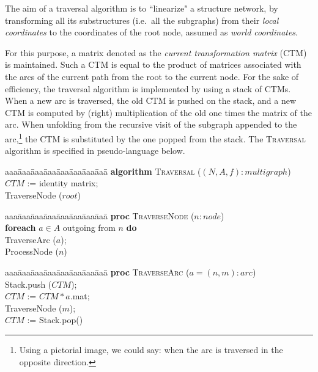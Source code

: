 \begin{coding}
The aim of a traversal algorithm is to ``linearize" a 
structure network, by transforming all its substructures (i.e.~all the
subgraphs) from their \emph{local coordinates} to the coordinates of
the root node, assumed as \emph{world coordinates}.

For this purpose, a matrix denoted as the \emph{current transformation
matrix} (CTM) is maintained.  Such a CTM is equal to the product of
matrices associated with the arcs of the current path from the root to
the current node.  For the sake of efficiency, the traversal algorithm is
implemented by using a stack of CTMs.  When a new arc is traversed,
the old CTM is pushed on the stack, and a new CTM is computed by
(right) multiplication of the old one times the matrix of the arc. 
When unfolding from the recursive visit of the subgraph appended to the
arc,\footnote{Using a pictorial image, we could say: when the arc is
traversed in the opposite direction.} the CTM is substituted by the one
popped from the stack.  The \textsc{Traversal} algorithm is specified
in pseudo-language below.


\begin{script}
\begin{tabbing}
aaa\=aaa\=aaa\=aaa\=aaa\=aaa\=aaa\=aaa\=\kill
{\bf algorithm} \textsc{Traversal} ($(N,A,f): multigraph$) \+\\
   $CTM$ := identity matrix;\\
    TraverseNode ($root$)
\end{tabbing}


\begin{tabbing}
aaa\=aaa\=aaa\=aaa\=aaa\=aaa\=aaa\=aaa\=\kill
{\bf proc} \textsc{TraverseNode} ($n: node$) \+\\
  \textbf{foreach} $a\in A
  $ outgoing from $n$
  \textbf{do} \+\\
    TraverseArc ($a$); \\
  ProcessNode ($n$)
\end{tabbing}


\begin{tabbing}
aaa\=aaa\=aaa\=aaa\=aaa\=aaa\=aaa\=aaa\=\kill
{\bf proc} \textsc{TraverseArc} ($a=(n,m): arc$) \+\\ 
  Stack.push ($CTM$);\\
  $CTM$ := $CTM * a$.mat;\\
  TraverseNode ($m$);\\
  $CTM$ := Stack.pop()
\end{tabbing}




\end{script}
\end{coding}
